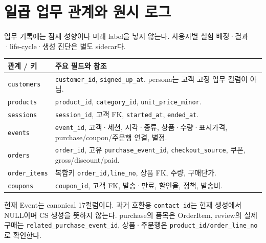 \documentclass[11pt,a4paper]{article}
\newcommand{\code}[1]{{\ttfamily\footnotesize\nolinkurl{#1}}}
\newcommand{\page}{\clearpage}
\newcommand{\thead}{\rowcolor{pale}}
\begin{document}
\page
\section{일곱 업무 관계와 원시 로그}
업무 기록에는 잠재 성향이나 미래 label을 넣지 않는다. 사용자별 실험 배정·결과·life-cycle·생성 진단은 별도 sidecar다.

\begin{center}
\end{center}

{\small\begin{tabularx}{\linewidth}{@{}P{.19\linewidth}Y@{}}
\thead 관계 / 키 & 주요 필드와 참조\\\midrule
\code{customers} & \code{customer_id}, \code{signed_up_at}. persona는 고객 고정 업무 컬럼이 아님.\\
\code{products} & \code{product_id}, \code{category_id}, \code{unit_price_minor}.\\
\code{sessions} & \code{session_id}, 고객 FK, \code{started_at}, \code{ended_at}.\\
\code{events} & \code{event_id}, 고객·세션, 시각·종류, 상품·수량·표시가격, purchase/coupon/주문행 연결, 별점.\\
\code{orders} & \code{order_id}, 고유 \code{purchase_event_id}, \code{checkout_source}, 쿠폰, gross/discount/paid.\\
\code{order_items} & 복합키 \code{order_id,line_no}, 상품 FK, 수량, 구매단가.\\
\code{coupons} & \code{coupon_id}, 고객 FK, 발송·만료, 할인율, 정책, 발송비.\\\bottomrule
\end{tabularx}}

현재 Event는 canonical 17컬럼이다. 과거 호환용 \code{contact_id}는 현재 생성에서 NULL이며 CS 생성을 뜻하지 않는다. purchase의 품목은 OrderItem, review의 실제 구매는 \code{related_purchase_event_id}, 상품·주문행은 \code{product_id/order_line_no}로 확인한다.
\end{document}
